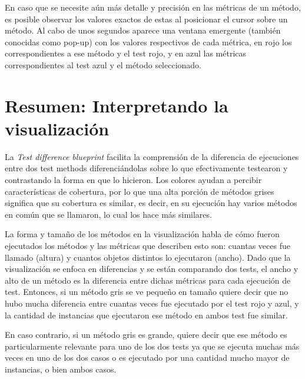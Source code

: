 \par En caso que se necesite aún más detalle y precisión en las métricas de un método, es posible observar los valores exactos de estas al posicionar el cursor sobre un método. Al cabo de unos segundos aparece una ventana emergente (también conocidas como pop-up) con los valores respectivos de cada métrica, en rojo los correspondientes a ese método y el test rojo, y en azul las métricas correspondientes al test azul y el método seleccionado.


\section{Resumen: Interpretando la visualización}


\par La \emph{Test difference blueprint} facilita la comprensión de la diferencia de ejecuciones entre dos test methods diferenciándolas sobre lo que efectivamente testearon y contrastando la forma en que lo hicieron. Los colores ayudan a percibir características de cobertura, por lo que una alta porción de métodos grises significa que su cobertura es similar, es decir, en su ejecución hay varios métodos en común que se llamaron, lo cual los hace más similares.

\par La forma y tamaño de los métodos en la visualización habla de cómo fueron ejecutados los métodos y las métricas que describen esto son: cuantas veces fue llamado (altura) y cuantos objetos distintos lo ejecutaron (ancho). Dado que la visualización se enfoca en diferencias y se están comparando dos tests, el ancho y alto de un método es la diferencia entre dichas métricas para cada ejecución de test. Entonces, si un método gris se ve pequeño en tamaño quiere decir que no hubo mucha diferencia entre cuantas veces fue ejecutado por el test rojo y azul, y la cantidad de instancias que ejecutaron ese método en ambos test fue similar. 

\par En caso contrario, si un método gris es grande, quiere decir que ese método es particularmente relevante para uno de los dos tests ya que se ejecuta muchas más veces en uno de los dos casos o es ejecutado por una cantidad mucho mayor de instancias, o bien ambos casos. 

